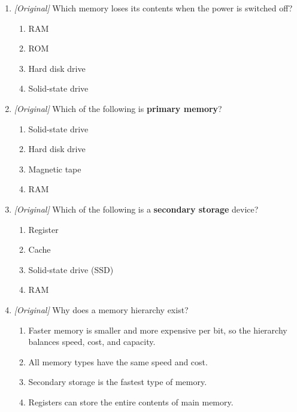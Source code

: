 \begin{enumerate}[label=\textbf{Q\arabic*.}, leftmargin=*]
  ROM is \underline{\hspace{2.2cm}}.
  \begin{enumerate}[label=\Alph*.]
    \item non-volatile; volatile
    \item volatile; non-volatile
    \item read-only; writable
    \item secondary; primary
  \end{enumerate}
\item \textit{[Original]} Which memory loses its contents when the power is
  switched off?
  \begin{enumerate}[label=\Alph*.]
    \item RAM
    \item ROM
    \item Hard disk drive
    \item Solid-state drive
  \end{enumerate}
\item \textit{[Original]} Which of the following is \textbf{primary memory}?
  \begin{enumerate}[label=\Alph*.]
    \item Solid-state drive
    \item Hard disk drive
    \item Magnetic tape
    \item RAM
  \end{enumerate}
\item \textit{[Original]} Which of the following is a \textbf{secondary
  storage} device?
  \begin{enumerate}[label=\Alph*.]
    \item Register
    \item Cache
    \item Solid-state drive (SSD)
    \item RAM
  \end{enumerate}
\item \textit{[Original]} Why does a memory hierarchy exist?
  \begin{enumerate}[label=\Alph*.]
    \item Faster memory is smaller and more expensive per bit, so the
      hierarchy balances speed, cost, and capacity.
    \item All memory types have the same speed and cost.
    \item Secondary storage is the fastest type of memory.
    \item Registers can store the entire contents of main memory.

\end{enumerate}
\end{enumerate}
